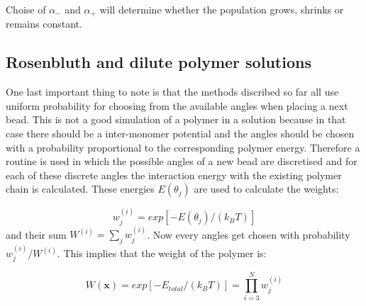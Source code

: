 Choise of $\alpha_-$ and $\alpha_+$ will determine whether the population grows, shrinks or remains constant.


\subsection*{Rosenbluth and dilute polymer solutions}
One last important thing to note is that the methods discribed so far all use uniform probability for choosing from the available angles when placing a next bead. This is not a good simulation of a polymer in a solution because in that case there should be a inter-monomer potential and the angles should be chosen with a probability proportional to the corresponding polymer energy.
Therefore a routine is used in which the possible angles of a new bead are discretised and for each of these discrete angles the interaction energy with the existing polymer chain is calculated. These energies $E\left(\theta_j\right)$ are used to calculate the weights:

\begin{equation}
	w_j^{(i)} = exp [-E\left(\theta_j\right) / \left( k_B T \right)]
\end{equation}
and their sum $W^{(i)} = \sum_j w_j^{(i)}$. Now every angles get chosen with probability $w_j^{(i)}/W^{(i)}$. This implies that the weight of the polymer is:

\begin{equation}
	W(\mathbf{x}) = exp\left[-E_{total}/ \left( k_B T \right) \right] = \prod_{i=3}^{N} w_j^{(i)}
\end{equation}